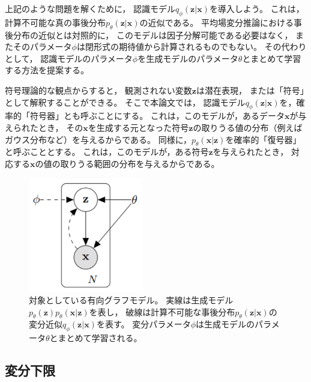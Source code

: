 \documentclass[dvipdfmx, fleqn, draft]{jsarticle}
\begin{document}
上記のような問題を解くために，
認識モデル\(q_{\phi} (\bm{z} | \bm{x})\)を導入しよう。
これは，計算不可能な真の事後分布\(p_{\theta} (\bm{z} | \bm{x})\)の近似である。
平均場変分推論における事後分布の近似とは対照的に，
このモデルは因子分解可能である必要はなく，
またそのパラメータ\(\phi\)は閉形式の期待値から計算されるものでもない。
その代わりとして，
認識モデルのパラメータ\(\phi\)を生成モデルのパラメータ\(\theta\)とまとめて学習する方法を提案する。

符号理論的な観点からすると，
観測されない変数\(\bm{z}\)は潜在表現，
または「符号」として解釈することができる。
そこで本論文では，
認識モデル\(q_{\phi} (\bm{z} | \bm{x})\)を，確率的「符号器」とも呼ぶことにする。
これは，このモデルが，あるデータ\(\bm{x}\)が与えられたとき，
その\(\bm{x}\)を生成する元となった符号\(\bm{z}\)の取りうる値の分布（例えばガウス分布など）を与えるからである。
同様に，\(p_{\theta} (\bm{x} | \bm{z})\)を確率的「復号器」と呼ぶこととする。
これは，このモデルが，ある符号\(\bm{z}\)を与えられたとき，
対応する\(\bm{x}\)の値の取りうる範囲の分布を与えるからである。

\begin{figure}
    \centering
    \includegraphics[clip, width=5cm]{../figures/graphical_model}
    \caption{
        対象としている有向グラフモデル。
        実線は生成モデル\(p_{\theta} (\bm{z}) p_{\theta} (\bm{x} | \bm{z})\)を表し，
        破線は計算不可能な事後分布\(p_{\theta} (\bm{z} | \bm{x})\)の変分近似\(q_{\phi} (\bm{z} | \bm{x})\)を表す。
        変分パラメータ\(\phi\)は生成モデルのパラメータ\(\theta\)とまとめて学習される。
        }
    \label{fig:graphical_model}
\end{figure}



\subsection{変分下限}
\end{document}
